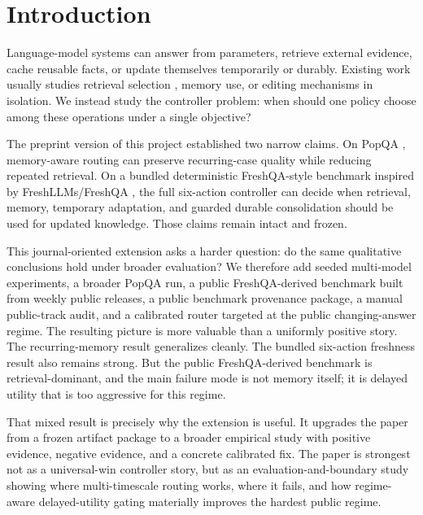 \section{Introduction}

Language-model systems can answer from parameters, retrieve external evidence, cache reusable facts, or update themselves temporarily or durably. Existing work usually studies retrieval selection \citep{asai2024selfrag,yan2024crag}, memory use, or editing mechanisms \citep{wang2024wise,yu2023melo,zhang2024keStudy} in isolation. We instead study the controller problem: when should one policy choose among these operations under a single objective?

The preprint version of this project established two narrow claims. On PopQA \citep{mallen2022trust}, memory-aware routing can preserve recurring-case quality while reducing repeated retrieval. On a bundled deterministic FreshQA-style benchmark inspired by FreshLLMs/FreshQA \citep{vu2024freshllms}, the full six-action controller can decide when retrieval, memory, temporary adaptation, and guarded durable consolidation should be used for updated knowledge. Those claims remain intact and frozen.

This journal-oriented extension asks a harder question: do the same qualitative conclusions hold under broader evaluation? We therefore add seeded multi-model experiments, a broader PopQA run, a public FreshQA-derived benchmark built from weekly public releases, a public benchmark provenance package, a manual public-track audit, and a calibrated router targeted at the public changing-answer regime. The resulting picture is more valuable than a uniformly positive story. The recurring-memory result generalizes cleanly. The bundled six-action freshness result also remains strong. But the public FreshQA-derived benchmark is retrieval-dominant, and the main failure mode is not memory itself; it is delayed utility that is too aggressive for this regime.

That mixed result is precisely why the extension is useful. It upgrades the paper from a frozen artifact package to a broader empirical study with positive evidence, negative evidence, and a concrete calibrated fix. The paper is strongest not as a universal-win controller story, but as an evaluation-and-boundary study showing where multi-timescale routing works, where it fails, and how regime-aware delayed-utility gating materially improves the hardest public regime.
